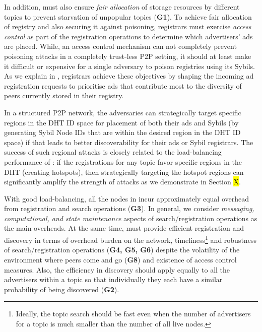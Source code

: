 In addition, \sysname must also ensure \textit{fair allocation} of storage resources by different topics to prevent starvation of unpopular topics (\textbf{G1}). To achieve fair allocation of registry and also securing it against poisoning, registrars must exercise \textit{access control} as part of the registration operations to determine which advertisers' ads are placed. While, an access control mechanism can not completely prevent poisoning attacks in a completely trust-less P2P setting, it should at least make it difficult or expensive for a single adversary to poison registries using its Sybils. As we explain in , registrars achieve these objectives by shaping the incoming ad registration requests to prioritise ads that contribute most to the diversity of peers currently stored in their registry.


In a structured P2P network, the adversaries can strategically target specific regions in the DHT ID space for placement of both their ads and Sybils (\ie by generating Sybil Node IDs that are within the desired region in the DHT ID space) if that leads to better discoverability for their ads or Sybil registrars. The success of such regional attacks is closely related to the load-balancing performance of \sysname: if the registrations for any topic favor specific regions in the DHT (\ie creating hotspots), then strategically targeting the hotspot regions can significantly amplify the strength of attacks as we demonstrate in Section \hl{X}. 

 With good load-balancing, all the nodes in \sysname incur approximately equal overhead from registration and search operations (\textbf{G3}). In general, we consider \textit{messaging, computational, and state maintenance} aspects of search/registration operations as the main overheads. At the same time, \sysname must provide efficient registration and discovery in terms of overhead burden on the network, timeliness\footnote{Ideally, the topic search should be fast even when the number of advertisers for a topic is much smaller than the number of all live nodes.} and robustness of search/registration operations (\textbf{G4, G5, G6}) despite the volatility of the environment where peers come and go (\textbf{G8}) and existence of access control measures. Also, the efficiency in discovery should apply equally to all the advertisers within a topic so that individually they each have a similar probability of being discovered (\textbf{G2}). 


